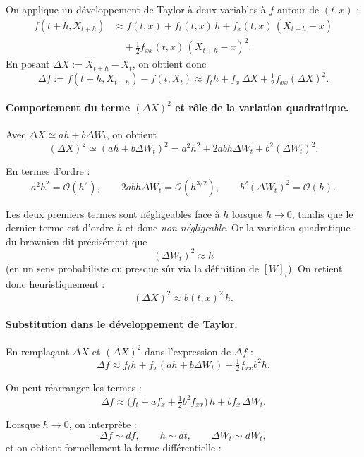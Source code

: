 \documentclass[11pt,a4paper]{article}
\newcommand{\1}{\mathbf{1}}
\begin{document}
On applique un d\'eveloppement de Taylor \`a deux variables \`a $f$ autour de $(t,x)$ :
\[
\begin{aligned}
f(t+h,X_{t+h})
&\approx f(t,x)
+ f_t(t,x)\,h
+ f_x(t,x)\,(X_{t+h}-x) \\
&\quad + \frac12 f_{xx}(t,x)\,(X_{t+h}-x)^2.
\end{aligned}
\]
En posant $\Delta X := X_{t+h}-X_t$, on obtient donc
\[
\Delta f := f(t+h,X_{t+h}) - f(t,X_t)
\approx
f_t h + f_x\,\Delta X + \tfrac12 f_{xx} (\Delta X)^2.
\]

\paragraph{Comportement du terme $(\Delta X)^2$ et r\^ole de la variation quadratique.}

Avec $\Delta X \simeq a h + b \Delta W_t$, on obtient
\[
(\Delta X)^2 \simeq (a h + b \Delta W_t)^2
= a^2 h^2 + 2ab h \Delta W_t + b^2 (\Delta W_t)^2.
\]

En termes d'ordre :
\[
a^2 h^2 = \mathcal{O}(h^2),
\qquad
2ab h\Delta W_t = \mathcal{O}(h^{3/2}),
\qquad
b^2 (\Delta W_t)^2 = \mathcal{O}(h).
\]

Les deux premiers termes sont n\'egligeables face \`a $h$ lorsque $h\to 0$,
tandis que le dernier terme est d'ordre $h$ et donc \emph{non n\'egligeable}.
Or la variation quadratique du brownien dit précisément que
\[
(\Delta W_t)^2 \approx h
\]
(en un sens probabiliste ou presque s\^ur via la d\'efinition de $[W]_t$).
On retient donc heuristiquement :
\[
(\Delta X)^2 \approx b(t,x)^2\,h.
\]

\paragraph{Substitution dans le d\'eveloppement de Taylor.}

En rempla\c{c}ant $\Delta X$ et $(\Delta X)^2$ dans l'expression de $\Delta f$ :
\[
\Delta f
\approx f_t h + f_x (a h + b\Delta W_t)
+ \tfrac12 f_{xx} b^2 h.
\]

On peut r\'earranger les termes :
\[
\Delta f
\approx
\bigl( f_t + a f_x + \tfrac12 b^2 f_{xx} \bigr)\, h
+ b f_x \,\Delta W_t.
\]

Lorsque $h \to 0$, on interpr\`ete :
\[
\Delta f \sim df,
\qquad h \sim dt,
\qquad \Delta W_t \sim dW_t,
\]
et on obtient formellement la forme diff\'erentielle :
\end{document}
